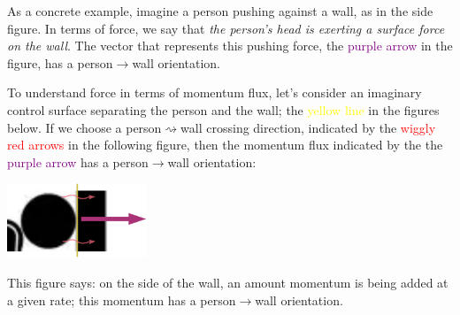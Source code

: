 \documentclass[a4paper,12pt,%
onecolumn,oneside,%
british%
]{memoir}
\renewcommand*{\|}[1][]{\nonscript\:#1\vert\nonscript\:\mathopen{}}
\begin{document}
%
%
As a concrete example, imagine a person pushing against a wall, as in the side figure. In terms of force, we say that \emph{the person's head is exerting a surface force on the wall}. The vector that represents this pushing force, the \textcolor{purple}{purple arrow} in the figure, has a person$\to$wall orientation.

To understand force in terms of momentum flux, let's consider an imaginary control surface separating the person and the wall; the \textcolor{yellow}{yellow line} in the figures below. If we choose a person$\rightsquigarrow$wall crossing direction, indicated by the \textcolor{red}{wiggly red arrows} in the following figure, then the momentum flux indicated by the the \textcolor{purple}{purple arrow} has a person$\rightarrow$wall orientation:\noprelistbreak
\begin{center}
  \includegraphics[height=6em]{images/person_push_flux_right.pdf}
\end{center}
This figure says: on the side of the wall, an amount momentum is being added at a given rate; this momentum has a person$\rightarrow$wall orientation.
\end{document}
